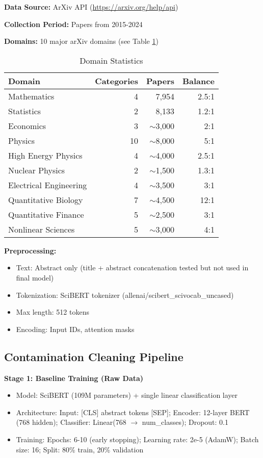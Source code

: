 \documentclass{article}
\begin{document}
\textbf{Data Source:} ArXiv API (\url{https://arxiv.org/help/api})

\textbf{Collection Period:} Papers from 2015-2024

\textbf{Domains:} 10 major arXiv domains (see Table \ref{tab:domains})

\begin{table}[h]
\centering
\caption{Domain Statistics}
\label{tab:domains}
\begin{tabular}{lrrr}
\toprule
\textbf{Domain} & \textbf{Categories} & \textbf{Papers} & \textbf{Balance} \\
\midrule
Mathematics & 4 & 7,954 & 2.5:1 \\
Statistics & 2 & 8,133 & 1.2:1 \\
Economics & 3 & $\sim$3,000 & 2:1 \\
Physics & 10 & $\sim$8,000 & 5:1 \\
High Energy Physics & 4 & $\sim$4,000 & 2.5:1 \\
Nuclear Physics & 2 & $\sim$1,500 & 1.3:1 \\
Electrical Engineering & 4 & $\sim$3,500 & 3:1 \\
Quantitative Biology & 7 & $\sim$4,500 & 12:1 \\
Quantitative Finance & 5 & $\sim$2,500 & 3:1 \\
Nonlinear Sciences & 5 & $\sim$3,000 & 4:1 \\
\bottomrule
\end{tabular}
\end{table}

\textbf{Preprocessing:}
\begin{itemize}
    \item Text: Abstract only (title + abstract concatenation tested but not used in final model)
    \item Tokenization: SciBERT tokenizer (allenai/scibert\_scivocab\_uncased)
    \item Max length: 512 tokens
    \item Encoding: Input IDs, attention masks
\end{itemize}

\subsection{Contamination Cleaning Pipeline}

\textbf{Stage 1: Baseline Training (Raw Data)}
\begin{itemize}
    \item Model: SciBERT (109M parameters) + single linear classification layer
    \item Architecture: Input: [CLS] abstract tokens [SEP]; Encoder: 12-layer BERT (768 hidden); Classifier: Linear(768 $\rightarrow$ num\_classes); Dropout: 0.1
    \item Training: Epochs: 6-10 (early stopping); Learning rate: 2e-5 (AdamW); Batch size: 16; Split: 80\% train, 20\% validation
\end{itemize}
\end{document}
